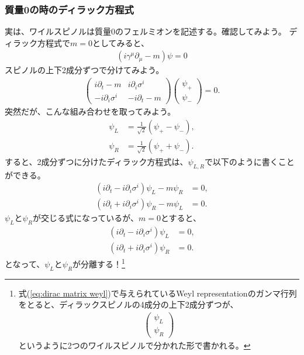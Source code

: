 \documentclass[10pt,a4paper]{jarticle}
\begin{document}
\subsubsection{質量0の時のディラック方程式}
実は、ワイルスピノルは質量$0$のフェルミオンを記述する。確認してみよう。
ディラック方程式で$m=0$としてみると、
\begin{align}
(i \gamma^\mu \partial_\mu -m )\psi = 0
\end{align}
スピノルの上下2成分ずつで分けてみよう。
\begin{align}
\left(\begin{array}{cc}
i\partial_t - m & i \partial_i \sigma^i \\
-i \partial_i \sigma^i & -i\partial_t - m
\end{array}\right) \left(
\begin{array}{c}
\psi_+ \\
\psi_-
\end{array}
\right) = 0.
\end{align}
%
突然だが、こんな組み合わせを取ってみよう。
\begin{align}
\psi_L &= \frac{1}{\sqrt{2}} (\psi_+ - \psi_-), \\
\psi_R &= \frac{1}{\sqrt{2}} (\psi_+ + \psi_-).
\end{align}
%
すると、2成分ずつに分けたディラック方程式は、$\psi_{L,R}$で以下のように書くことができる。
\begin{align}
(i\partial_t - i \partial_i \sigma^i) \psi_L - m \psi_R &= 0, \\
(i\partial_t + i \partial_i \sigma^i) \psi_R - m \psi_L &= 0.
\end{align}
$\psi_L$と$\psi_R$が交じる式になっているが、$m=0$とすると、
\begin{align}
(i\partial_t - i \partial_i \sigma^i) \psi_L &= 0, \\
(i\partial_t + i \partial_i \sigma^i) \psi_R &= 0.
\end{align}
となって、$\psi_L$と$\psi_R$が分離する！\footnote{
式(\ref{eq:dirac matrix weyl})で与えられているWeyl representationのガンマ行列をとると、ディラックスピノルの4成分の上下2成分ずつが、
\begin{align}
\left(\begin{array}{c}
\psi_L \\
\psi_R
\end{array}\right)
\end{align}
というように2つのワイルスピノルで分かれた形で書かれる。}
\end{document}
